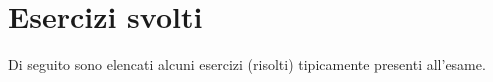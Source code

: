 \documentclass[]{article}
\begin{document}
	\section{Esercizi svolti}
	 	Di seguito sono elencati alcuni esercizi (risolti) tipicamente presenti all'esame.
		
		
		
		
		
		
		
		
		
		
\end{document}
